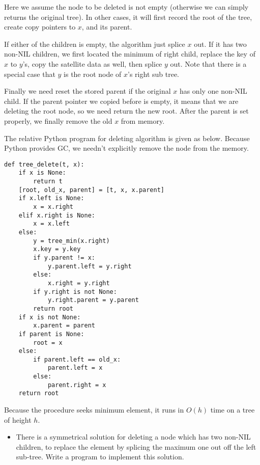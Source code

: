 \documentclass{article}
\begin{document}
Here we assume the node to be deleted is not empty (otherwise we can
simply returns the original tree). In other cases, it will first record
the root of the tree, create copy pointers to $x$, and its parent.

If either of the children is empty, the algorithm just splice $x$ out.
If it has two non-NIL children, we first located the minimum of right
child, replace the key of $x$ to $y$'s, copy the satellite data as
well, then splice $y$ out. Note that there is a special case that $y$
is the root node of $x$'s right sub tree.

Finally we need reset the stored parent if the original $x$ has only
one non-NIL child.
If the parent pointer we copied before is empty, it
means that we are deleting the root node, so we need return the new root. After
the parent is set properly, we finally remove the old $x$ from memory.

The relative Python program for deleting algorithm is given as below.
Because Python provides GC, we needn't explicitly remove the node
from the memory.

\lstset{language=Python}
\begin{lstlisting}
def tree_delete(t, x):
    if x is None:
        return t
    [root, old_x, parent] = [t, x, x.parent]
    if x.left is None:
        x = x.right
    elif x.right is None:
        x = x.left
    else:
        y = tree_min(x.right)
        x.key = y.key
        if y.parent != x:
            y.parent.left = y.right
        else:
            x.right = y.right
        if y.right is not None:
            y.right.parent = y.parent
        return root
    if x is not None:
        x.parent = parent
    if parent is None:
        root = x
    else:
        if parent.left == old_x:
            parent.left = x
        else:
            parent.right = x
    return root
\end{lstlisting}

Because the procedure seeks minimum element, it runs in $O(h)$ time on
a tree of height $h$.

\begin{Exercise}

\begin{itemize}
\item There is a symmetrical solution for deleting a node which has two
non-NIL children, to replace the element by splicing the maximum one out
off the left sub-tree. Write a program to implement this solution.
\end{itemize}

\end{Exercise}
\end{document}

